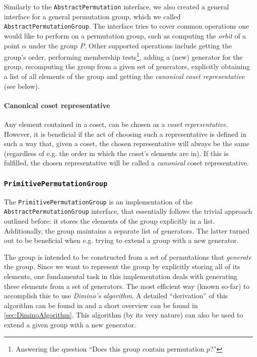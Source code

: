 \documentclass[parskip=half]{scrartcl}
\newcommand{\code}[1]{\texttt{#1}}
\newcommand{\class}[1]{\code{#1}}
\begin{document}
	Similarly to the \class{AbstractPermutation} interface, we also created a general interface for a general permutation group, which we called
	\class{AbstractPermutationGroup}. The interface tries to cover common operations one would like to perform on a permutation group, such as
	computing the \emph{orbit} of a point $\alpha$ under the group $P$. Other supported operations include getting the group's order, performing
	membership tests\footnote{Answering the question \enquote{Does this group contain permutation $p$?}}, adding a (new) generator for the group,
	recomputing the group from a given set of generators, explicitly obtaining a list of all elements of the group and getting the \emph{canonical
	coset representative} (see below).

	\paragraph{Canonical coset representative} Any element contained in a coset, can be chosen as a \emph{coset representative}. However, it is
	beneficial if the act of choosing such a representative is defined in such a way that, given a coset, the chosen representative will always be
	the same (regardless of e.g. the order in which the coset's elements are in). If this is fulfilled, the chosen representative will be called a
	\emph{canonical} coset representative.


	\subsubsection{\class{PrimitivePermutationGroup}}

	The \class{PrimitivePermutationGroup} is an implementation of the \class{AbstractPermutationGroup} interface, that essentially follows the trivial
	approach outlined before: it stores the elements of the group explicitly in a list. Additionally, the group maintains a separate list of
	generators. The latter turned out to be beneficial when e.g. trying to extend a group with a new generator.

	The group is intended to be constructed from a set of permutations that \emph{generate} the group. Since we want to represent the group by
	explicitly storing all of its elements, one fundamental task in this implementation deals with generating these elements from a set of generators.
	The most efficient way (known so-far) to accomplish this to use \emph{Dimino's algorithm}.\supercite{Butler1991a} A detailed \enquote{derivation}
	of this algorithm can be found in \textcite{Butler1991a} and a short overview can be found in \cref{sec:DiminoAlgorithm}. This algorithm (by its
	very nature) can also be used to extend a given group with a new generator.
\end{document}
